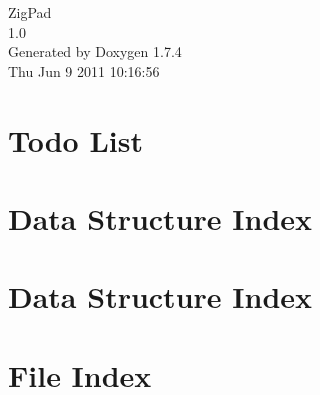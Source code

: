\documentclass[a4paper]{book}
\begin{document}
\hypersetup{pageanchor=false}
\begin{titlepage}
\vspace*{7cm}
\begin{center}
{\Large ZigPad \\[1ex]\large 1.0 }\\
\vspace*{1cm}
{\large Generated by Doxygen 1.7.4}\\
\vspace*{0.5cm}
{\small Thu Jun 9 2011 10:16:56}\\
\end{center}
\end{titlepage}
\clearemptydoublepage
{}
\tableofcontents
\clearemptydoublepage
{}
\hypersetup{pageanchor=true}
\chapter{Todo List}
\label{todo}
\hypertarget{todo}{}

\chapter{Data Structure Index}

\chapter{Data Structure Index}

\chapter{File Index}

\end{document}

